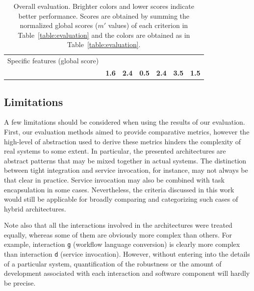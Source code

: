 \documentclass[preprint,3p,twocolumn]{elsarticle}
\newcommand{\correction}[1]{\color{blue}#1\color{black}\xspace}
\begin{document}
\begin{table}
\begin{tabular}{rcccccc}
Specific features (global score) & \cellcolor[HTML]{99FF99}{0.00}
                                     & \cellcolor[HTML]{999999}{1.00}
                                     & \cellcolor[HTML]{99FF99}{0.00}
                                     & \cellcolor[HTML]{999999}{1.00}
                                     & \cellcolor[HTML]{99FF99}{0.00}
                                     & \cellcolor[HTML]{99FF99}{0.00}\\
                                    & \cellcolor[HTML]{99DA99}\textbf{1.6}
                                    & \cellcolor[HTML]{99B899}\textbf{\correction{2.4}}
                                    & \cellcolor[HTML]{99FF99}\textbf{0.5}
                                    & \cellcolor[HTML]{99BF99}\textbf{2.4}
                                    & \cellcolor[HTML]{999999}\textbf{3.5}
                                    & \cellcolor[HTML]{99DE99}\textbf{1.5}\\
\end{tabular}
\caption{Overall evaluation. Brighter colors and lower scores indicate better performance. Scores
  are obtained by summing the normalized global scores ($m'$ values) of
  each criterion in Table~\ref{table:evaluation} and the colors are obtained as in Table~\ref{table:evaluation}. }
\label{table:overall}
\end{table}

\subsection{Limitations}


A few limitations should be considered when using the results of our
evaluation. First, our evaluation methods aimed to provide comparative
metrics, however the high-level of abstraction used to derive these
metrics hinders the complexity of real systems to some
extent. In particular, the
presented architectures are abstract patterns that may be mixed
together in actual systems. The distinction between tight integration and
service invocation, for instance, may not always be that clear in
practice. Service invocation may also be combined with task
encapsulation in some cases. Nevertheless, the criteria discussed in this
work would still be applicable for broadly comparing and categorizing such cases of
hybrid architectures.

Note also that all the interactions involved in the architectures were
treated equally, whereas some of them are obviously more complex than
others. For example, interaction \texttt{g} (workflow language
conversion) is clearly more complex than interaction \texttt{d}
(service invocation). However, without entering into the details of a particular
system, quantification of the robustness or the amount of development
associated with each interaction and software component will hardly be
precise.
\end{document}
